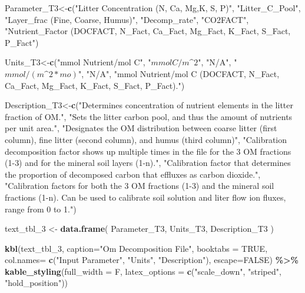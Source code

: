 \documentclass[
]{article}
\newenvironment{Shaded}{\begin{snugshade}}{\end{snugshade}}
\newcommand{\DataTypeTok}[1]{\textcolor[rgb]{0.13,0.29,0.53}{#1}}
\newcommand{\DecValTok}[1]{\textcolor[rgb]{0.00,0.00,0.81}{#1}}
\newcommand{\KeywordTok}[1]{\textcolor[rgb]{0.13,0.29,0.53}{\textbf{#1}}}
\newcommand{\NormalTok}[1]{#1}
\newcommand{\OperatorTok}[1]{\textcolor[rgb]{0.81,0.36,0.00}{\textbf{#1}}}
\newcommand{\OtherTok}[1]{\textcolor[rgb]{0.56,0.35,0.01}{#1}}
\newcommand{\StringTok}[1]{\textcolor[rgb]{0.31,0.60,0.02}{#1}}
\begin{document}
\begin{Shaded}
\begin{Highlighting}[]
\NormalTok{Parameter\_T3\textless{}{-}}\KeywordTok{c}\NormalTok{(}\StringTok{"Litter Concentration (N, Ca, Mg,K, S, P)"}\NormalTok{, }\StringTok{"Litter\textasciigrave{}\_C\textasciigrave{}\_Pool"}\NormalTok{, }\StringTok{"Layer\textasciigrave{}\_frac (Fine, Coarse, Humus)"}\NormalTok{, }\StringTok{"Decomp\textasciigrave{}\_rate"}\NormalTok{, }\StringTok{"CO2FACT"}\NormalTok{, }\StringTok{"Nutrient\textasciigrave{}\_Factor (DOCFACT, N\textasciigrave{}\_Fact, Ca\textasciigrave{}\_Fact, Mg\textasciigrave{}\_Fact, K\textasciigrave{}\_Fact, S\textasciigrave{}\_Fact, P\textasciigrave{}\_Fact"}\NormalTok{)}

\NormalTok{Units\_T3\textless{}{-}}\KeywordTok{c}\NormalTok{(}\StringTok{"mmol Nutrient/mol C"}\NormalTok{, }\StringTok{"$mmol C/m\^{}2$"}\NormalTok{, }\StringTok{"N/A"}\NormalTok{, }\StringTok{"$mmol/(m\^{}2*mo)$"}\NormalTok{, }\StringTok{"N/A"}\NormalTok{, }\StringTok{"mmol Nutrient/mol C (DOCFACT, N\textasciigrave{}\_Fact, Ca\textasciigrave{}\_Fact, Mg\textasciigrave{}\_Fact, K\textasciigrave{}\_Fact, S\textasciigrave{}\_Fact, P\textasciigrave{}\_Fact)."}\NormalTok{)}

\NormalTok{Description\_T3\textless{}{-}}\KeywordTok{c}\NormalTok{(}\StringTok{"Determines concentration of nutrient elements in the litter fraction of OM."}\NormalTok{, }\StringTok{"Sets the litter carbon pool, and thus the amount of nutrients per unit area."}\NormalTok{, }\StringTok{"Designates the OM distribution between coarse litter (first column), fine litter (second column), and humus (third column)"}\NormalTok{, }\StringTok{"Calibration decomposition factor shows up multiple times in the file for the 3 OM fractions (1{-}3) and for the mineral soil layers (1{-}n)."}\NormalTok{, }\StringTok{"Calibration factor that determines the proportion of decomposed carbon that effluxes as carbon dioxide."}\NormalTok{, }\StringTok{"Calibration factors for both the 3 OM fractions (1{-}3) and the mineral soil fractions (1{-}n). Can be used to calibrate soil solution and liter flow ion fluxes, range from 0 to 1."}\NormalTok{)}

\NormalTok{text\_tbl\_}\DecValTok{3}\NormalTok{ \textless{}{-}}\StringTok{ }\KeywordTok{data.frame}\NormalTok{(}
\NormalTok{Parameter\_T3, Units\_T3, Description\_T3}
\NormalTok{)}

\KeywordTok{kbl}\NormalTok{(text\_tbl\_}\DecValTok{3}\NormalTok{, }\DataTypeTok{caption=}\StringTok{"Om Decomposition File"}\NormalTok{, }\DataTypeTok{booktabs =} \OtherTok{TRUE}\NormalTok{, }\DataTypeTok{col.names=} \KeywordTok{c}\NormalTok{(}\StringTok{"Input Parameter"}\NormalTok{, }\StringTok{"Units"}\NormalTok{, }\StringTok{"Description"}\NormalTok{), }\DataTypeTok{escape=}\OtherTok{FALSE}\NormalTok{) }\OperatorTok{\%\textgreater{}\%}\StringTok{ }\KeywordTok{kable\_styling}\NormalTok{(}\DataTypeTok{full\_width =}\NormalTok{ F, }\DataTypeTok{latex\_options =} \KeywordTok{c}\NormalTok{(}\StringTok{"scale\_down"}\NormalTok{, }\StringTok{"striped"}\NormalTok{, }\StringTok{"hold\_position"}\NormalTok{))}
\end{Highlighting}
\end{Shaded}
\end{document}
